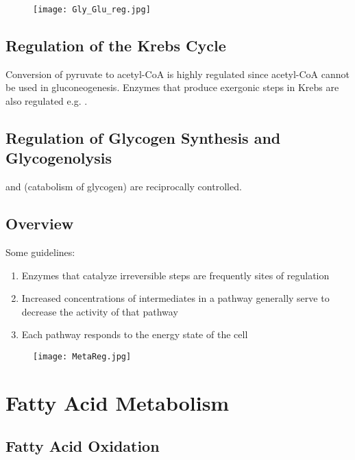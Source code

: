 \documentclass[../Bio_chemistryReview.tex]{subfiles}
\begin{document}
\begin{figure}[h]
  \centering
  \texttt{[image: Gly\_Glu\_reg.jpg]}
\end{figure}

\subsection{Regulation of the Krebs Cycle}

Conversion of pyruvate to acetyl-CoA is highly regulated since acetyl-CoA cannot
be used in gluconeogenesis. Enzymes that produce exergonic steps in Krebs are
also regulated e.g. .

\subsection{Regulation of Glycogen Synthesis and Glycogenolysis}

 and  (catabolism of
glycogen) are reciprocally controlled.

\subsection{Overview} Some guidelines: 
\begin{enumerate} 
  \item Enzymes that catalyze irreversible steps are frequently sites of
    regulation 
  \item Increased concentrations of intermediates in a pathway generally serve
    to decrease the activity of that pathway 
  \item Each pathway responds to the
    energy state of the cell 
\end{enumerate}

\begin{figure}[h] \centering \texttt{[image: MetaReg.jpg]}
\end{figure}

\section{Fatty Acid Metabolism}

\subsection{Fatty Acid Oxidation}
\end{document}
